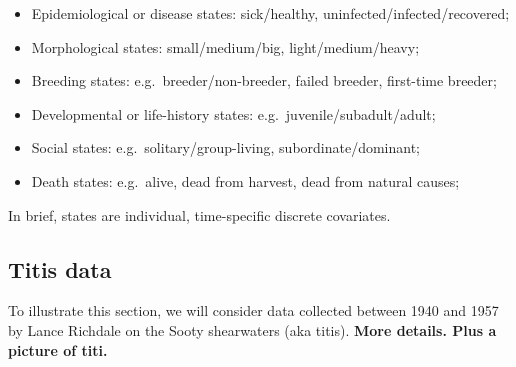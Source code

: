\documentclass[
  12pt,
]{krantz}
\providecommand{\tightlist}{%
  \setlength{\itemsep}{0pt}\setlength{\parskip}{0pt}}
\begin{document}
\begin{itemize}
\tightlist
\item
  Epidemiological or disease states: sick/healthy, uninfected/infected/recovered;\\
\item
  Morphological states: small/medium/big, light/medium/heavy;\\
\item
  Breeding states: e.g.~breeder/non-breeder, failed breeder, first-time breeder;\\
\item
  Developmental or life-history states: e.g.~juvenile/subadult/adult;\\
\item
  Social states: e.g.~solitary/group-living, subordinate/dominant;\\
\item
  Death states: e.g.~alive, dead from harvest, dead from natural causes;
\end{itemize}

In brief, states are individual, time-specific discrete covariates.

\hypertarget{titis-data}{%
\subsection{Titis data}\label{titis-data}}

To illustrate this section, we will consider data collected between 1940 and 1957 by Lance Richdale on the Sooty shearwaters (aka titis). \textbf{More details. Plus a picture of titi.}
\end{document}
